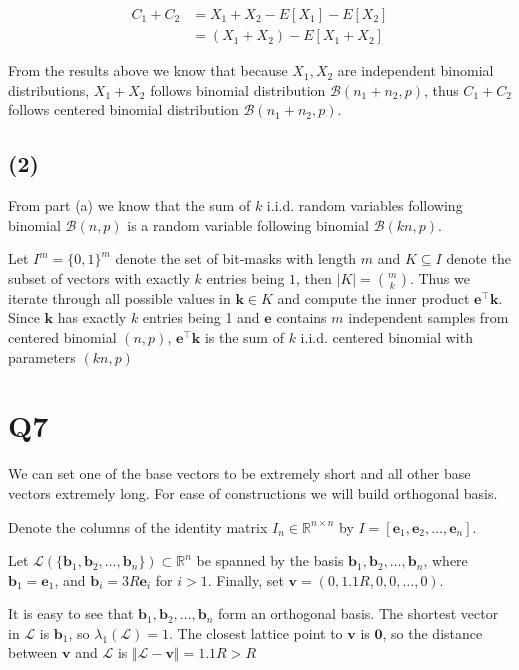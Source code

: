\documentclass{article}
\newcommand{\norm}[1]{\Vert {#1} \Vert}
\begin{document}
$$
\begin{aligned}
C_1 + C_2 &= X_1 + X_2 - E[X_1] - E[X_2] \\
&= (X_1 + X_2) - E[X_1 + X_2]
\end{aligned}
$$

From the results above we know that because $X_1, X_2$ are independent binomial distributions, $X_1 + X_2$ follows binomial distribution $\mathcal{B}(n_1 + n_2, p)$, thus $C_1 + C_2$ follows centered binomial distribution $\mathcal{B}(n_1 + n_2, p)$.

\subsection*{(2)}
From part (a) we know that the sum of $k$ i.i.d. random variables following binomial $\mathcal{B}(n, p)$ is a random variable following binomial $\mathcal{B}(kn, p)$.

Let $I^m = \{0, 1\}^m$ denote the set of bit-masks with length $m$ and $K \subseteq I$ denote the subset of vectors with exactly $k$ entries being $1$, then $\vert K \vert = {m\choose k}$. Thus we iterate through all possible values in $\mathbf{k} \in K$ and compute the inner product $\mathbf{e}^\intercal \mathbf{k}$. Since $\mathbf{k}$ has exactly $k$ entries being 1 and $\mathbf{e}$ contains $m$ independent samples from centered binomial $(n, p)$, $\mathbf{e}^\intercal\mathbf{k}$ is the sum of $k$ i.i.d. centered binomial with parameters $(kn, p)$

\newpage

\section*{Q7}
We can set one of the base vectors to be extremely short and all other base vectors extremely long. For ease of constructions we will build orthogonal basis.

Denote the columns of the identity matrix $I_n \in \mathbb{R}^{n \times n}$ by $I = [\mathbf{e}_1, \mathbf{e}_2, \ldots, \mathbf{e}_n]$.

Let $\mathcal{L}(\{\mathbf{b}_1, \mathbf{b}_2, \ldots, \mathbf{b}_n\}) \subset \mathbb{R}^n$ be spanned by the basis $\mathbf{b}_1, \mathbf{b}_2, \ldots, \mathbf{b}_n$, where $\mathbf{b}_1 = \mathbf{e}_1$, and $\mathbf{b}_i = 3R\mathbf{e}_i$ for $i > 1$. Finally, set $\mathbf{v} = (0, 1.1R, 0, 0, \ldots, 0)$.

It is easy to see that $\mathbf{b}_1, \mathbf{b}_2, \ldots, \mathbf{b}_n$ form an orthogonal basis. The shortest vector in $\mathcal{L}$ is $\mathbf{b}_1$, so $\lambda_1(\mathcal{L}) = 1$. The closest lattice point to $\mathbf{v}$ is $\mathbf{0}$, so the distance between $\mathbf{v}$ and $\mathcal{L}$ is $\norm{\mathcal{L} - \mathbf{v}} = 1.1R > R$
\end{document}
